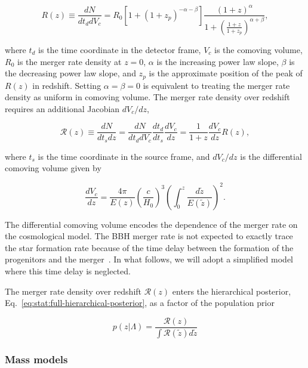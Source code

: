 \documentclass[%
preprint,
nofootinbib,
 amsmath,amssymb,
 aps,
]{revtex4-2}
\newcommand{\given}[2]{p( #1 | #2 )}
\newcommand{\pa}[1]{\left(#1\right)}
\begin{document}
\begin{equation}
	R(z) \equiv \frac{dN}{dt_d dV_c} = R_0 [1 + (1 + z_p)^{-\alpha -\beta}]\frac{(1 + z)^{\alpha}}{1 + \left ( \frac{1 + z}{1 + z_p} \right)^{\alpha + \beta}},
\end{equation}

where $t_d$ is the time coordinate in the detector frame, $V_c$ is the comoving volume, $R_0$ is
the merger rate density at $z=0$, $\alpha$ is the increasing power law slope, $\beta$ is the
decreasing power law slope, and $z_p$ is the approximate position of the peak of $R(z)$ in
redshift. Setting $\alpha = \beta = 0$ is equivalent to treating the merger rate density as uniform
in comoving volume. The merger rate density over redshift requires an additional Jacobian
$dV_c/dz$,

\begin{equation}
	\mathcal{R}(z) \equiv \frac{dN}{dt_s dz} = \frac{dN}{dt_d dV_c} \frac{dt_d}{dt_s} \frac{dV_c}{dz} = \frac{1}{1 + z} \frac{dV_c}{dz} R(z),
\end{equation}

where $t_s$ is the time coordinate in the source frame, and $dV_c /dz$ is the differential comoving
volume given by

\begin{equation}
	\frac{dV_c}{dz} =  \frac{4 \pi }{E(z)}\pa{\frac{c}{H_0}}^3 \pa{\int_0^z \frac{d\tilde{z}}{E(\tilde{z})}}^2.
\end{equation}

The differential comoving volume encodes the dependence of the merger rate on the cosmological
model. The BBH merger rate is not expected to exactly trace the star formation rate because of the
time delay between the formation of the progenitors and the
merger~\cite{santoliquido_cosmic_2020,fishbach_time_2021,van_son_redshift_2022}. In what follows,
we will adopt a simplified model where this time delay is neglected.

The merger rate density over redshift $\mathcal{R}(z)$ enters the hierarchical posterior,
Eq.~\eqref{eq:stat:full-hierarchical-posterior}, as a factor of the population prior

\begin{equation}
	\given{z}{\Lambda} = \frac{\mathcal{R}(z)}{\int \mathcal{R}(\tilde{z}) d\tilde{z}}
\end{equation}

\subsubsection{Mass models}
\end{document}
